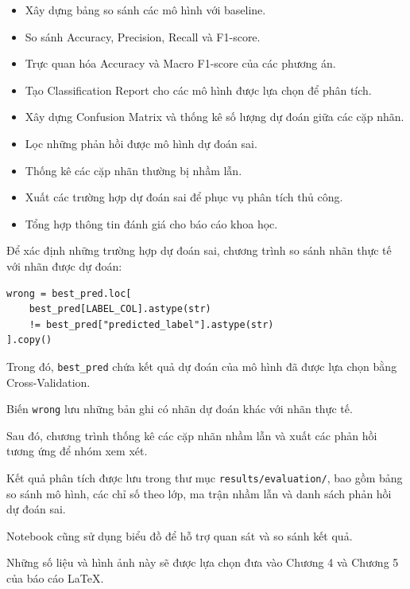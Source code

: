 \begin{itemize}
    \item Xây dựng bảng so sánh các mô hình với baseline.

    \item So sánh Accuracy, Precision, Recall và F1-score.

    \item Trực quan hóa Accuracy và Macro F1-score của các phương án.

    \item Tạo Classification Report cho các mô hình được lựa chọn để phân tích.

    \item Xây dựng Confusion Matrix và thống kê số lượng dự đoán giữa các cặp nhãn.

    \item Lọc những phản hồi được mô hình dự đoán sai.

    \item Thống kê các cặp nhãn thường bị nhầm lẫn.

    \item Xuất các trường hợp dự đoán sai để phục vụ phân tích thủ công.

    \item Tổng hợp thông tin đánh giá cho báo cáo khoa học.
\end{itemize}

Để xác định những trường hợp dự đoán sai, chương trình so sánh nhãn thực tế với nhãn được dự đoán:

\begin{verbatim}
wrong = best_pred.loc[
    best_pred[LABEL_COL].astype(str)
    != best_pred["predicted_label"].astype(str)
].copy()
\end{verbatim}

Trong đó, \texttt{best\_pred} chứa kết quả dự đoán của mô hình đã được lựa chọn bằng Cross-Validation.

Biến \texttt{wrong} lưu những bản ghi có nhãn dự đoán khác với nhãn thực tế.

Sau đó, chương trình thống kê các cặp nhãn nhầm lẫn và xuất các phản hồi tương ứng để nhóm xem xét.

Kết quả phân tích được lưu trong thư mục \texttt{results/evaluation/}, bao gồm bảng so sánh mô hình, các chỉ số theo lớp, ma trận nhầm lẫn và danh sách phản hồi dự đoán sai.

Notebook cũng sử dụng biểu đồ để hỗ trợ quan sát và so sánh kết quả.

Những số liệu và hình ảnh này sẽ được lựa chọn đưa vào Chương 4 và Chương 5 của báo cáo LaTeX.


